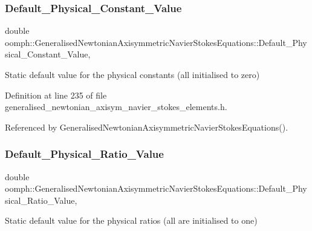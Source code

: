 \subsubsection{\texorpdfstring{Default\+\_\+\+Physical\+\_\+\+Constant\+\_\+\+Value}{Default\_Physical\_Constant\_Value}}
{\footnotesize\ttfamily double oomph\+::\+Generalised\+Newtonian\+Axisymmetric\+Navier\+Stokes\+Equations\+::\+Default\+\_\+\+Physical\+\_\+\+Constant\+\_\+\+Value\hspace{0.3cm}{\ttfamily [static]}, {\ttfamily [private]}}



Static default value for the physical constants (all initialised to zero) 



Definition at line 235 of file generalised\+\_\+newtonian\+\_\+axisym\+\_\+navier\+\_\+stokes\+\_\+elements.\+h.



Referenced by Generalised\+Newtonian\+Axisymmetric\+Navier\+Stokes\+Equations().

\mbox{\label{classoomph_1_1GeneralisedNewtonianAxisymmetricNavierStokesEquations_ac2fb6349682256ceaabf4de0c9af4089}} 
\subsubsection{\texorpdfstring{Default\+\_\+\+Physical\+\_\+\+Ratio\+\_\+\+Value}{Default\_Physical\_Ratio\_Value}}
{\footnotesize\ttfamily double oomph\+::\+Generalised\+Newtonian\+Axisymmetric\+Navier\+Stokes\+Equations\+::\+Default\+\_\+\+Physical\+\_\+\+Ratio\+\_\+\+Value\hspace{0.3cm}{\ttfamily [static]}, {\ttfamily [private]}}



Static default value for the physical ratios (all are initialised to one) 



